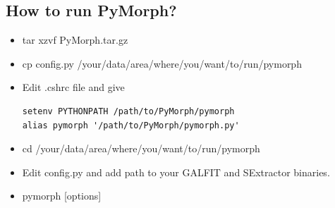 \documentclass[a4paper,10pt]{article}
\begin{document}
\subsection{How to run PyMorph?}
\begin{itemize}
\item tar xzvf PyMorph.tar.gz
\item cp config.py /your/data/area/where/you/want/to/run/pymorph
\item Edit .cshrc file and give
\begin{footnotesize}
\begin{verbatim}
setenv PYTHONPATH /path/to/PyMorph/pymorph
alias pymorph '/path/to/PyMorph/pymorph.py'
\end{verbatim}
\end{footnotesize}
\item cd /your/data/area/where/you/want/to/run/pymorph
\item Edit config.py and add path to your GALFIT and SExtractor binaries.
\item pymorph [options]
\end{itemize}
\end{document}

